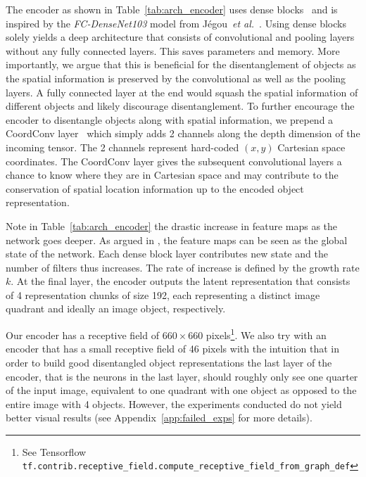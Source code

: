 \documentclass[a4paper,12pt]{report}
\begin{document}
The encoder as shown in Table~\ref{tab:arch_encoder} uses dense blocks~\cite{DenseNet} and is inspired by the \textit{FC-DenseNet103} model from Jégou~\textit{et al.}~\cite{Tiramisu}. Using dense blocks solely yields a deep architecture that consists of convolutional and pooling layers without any fully connected layers. This saves parameters and memory. More importantly, we argue that this is beneficial for the disentanglement of objects as the spatial information is preserved by the convolutional as well as the pooling layers. A fully connected layer at the end would squash the spatial information of different objects and likely discourage disentanglement. To further encourage the encoder to disentangle objects along with spatial information, we prepend a CoordConv layer~\cite{CoordConv} which simply adds 2 channels along the depth dimension of the incoming tensor. The 2 channels represent hard-coded $(x,y)$ Cartesian space coordinates. The CoordConv layer gives the subsequent convolutional layers a chance to know where they are in Cartesian space and may contribute to the conservation of spatial location information up to the encoded object representation. 

Note in Table~\ref{tab:arch_encoder} the drastic increase in feature maps as the network goes deeper. As argued in \cite{DenseNet}, the feature maps can be seen as the global state of the network. Each dense block layer contributes new state and the number of filters thus increases. The rate of increase is defined by the growth rate $k$. At the final layer, the encoder outputs the latent representation that consists of 4 representation chunks of size 192, each representing a distinct image quadrant and ideally an image object, respectively.

Our encoder has a receptive field of $660 \times 660$ pixels\footnote{See Tensorflow \texttt{tf.contrib.receptive\_field.compute\_receptive\_field\_from\_graph\_def}}. We also try with an encoder that has a small receptive field of 46 pixels with the intuition that in order to build good disentangled object representations the last layer of the encoder, that is the neurons in the last layer, should roughly only see one quarter of the input image, equivalent to one quadrant with one object as opposed to the entire image with 4 objects. However, the experiments conducted do not yield better visual results (see Appendix~\ref{app:failed_exps} for more details).
\end{document}

